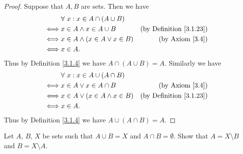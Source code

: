 \begin{proof}
    Suppose that \(A, B\) are sets.
    Then we have
    \begin{align*}
             & \forall\ x : x \in A \cap (A \cup B)                                       \\
        \iff & x \in A \land x \in A \cup B         & \text{(by Definition \ref{3.1.23})} \\
        \iff & x \in A \land (x \in A \lor x \in B) & \text{(by Axiom \ref{3.4})}         \\
        \iff & x \in A.
    \end{align*}
    Thus by Definition \ref{3.1.4} we have \(A \cap (A \cup B) = A\).
    Similarly we have
    \begin{align*}
             & \forall\ x : x \in A \cup (A \cap B)                                       \\
        \iff & x \in A \lor x \in A \cap B          & \text{(by Axiom \ref{3.4})}         \\
        \iff & x \in A \lor (x \in A \land x \in B) & \text{(by Definition \ref{3.1.23})} \\
        \iff & x \in A.
    \end{align*}
    Thus by Definition \ref{3.1.4} we have \(A \cup (A \cap B) = A\).
\end{proof}

\begin{exercise}\label{ex 3.1.9}
    Let \(A\), \(B\), \(X\) be sets such that \(A \cup B = X\) and \(A \cap B = \emptyset\).
    Show that \(A = X \setminus B\) and \(B = X \setminus A\).
\end{exercise}

